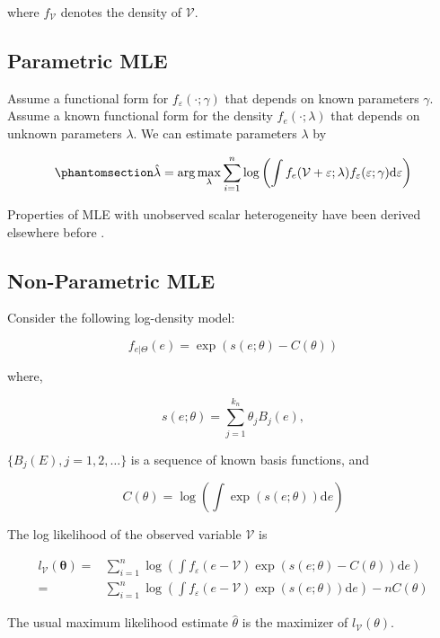 \documentclass[
  12pt]{article}
\theoremstyle{definition}
\theoremstyle{remark}
\begin{document}
where \(f_{\mathcal{V}}\) denotes the density of \(\mathcal{V}\).

\subsection{Parametric MLE}\label{parametric-mle}

Assume a functional form for \(f_{\varepsilon}(\cdot;\gamma)\) that
depends on known parameters \(\gamma\). Assume a known functional form
for the density \(f_e(\cdot;\lambda)\) that depends on unknown
parameters \(\lambda\). We can estimate parameters \(\lambda\) by

\begin{equation}\phantomsection\label{eq-mle}{
\hat \lambda = \arg \max_{\lambda}\sum_{i=1}^n \log \left(\int f_e(\mathcal{V}+\varepsilon;\lambda)f_{\varepsilon}(\varepsilon;\gamma)\text{d}\varepsilon\right)
}\end{equation}

Properties of MLE with unobserved scalar heterogeneity have been derived
elsewhere before \citep{Chen2007, Yi2021}.

\subsection{Non-Parametric MLE}\label{non-parametric-mle}

Consider the following log-density model:

\[
f_{e|\Theta}(e)=\exp(s(e;\theta)-C(\theta))
\]

where,

\[
s(e;\theta)=\sum_{j=1}^{k_n}\theta_j B_j(e),
\]

\(\{B_j(E), j=1,2,\dots\}\) is a sequence of known basis functions, and

\[
C(\theta) = \log\left(\int \exp(s(e;\theta)) \text{d}e \right)
\]

The log likelihood of the observed variable \(\mathcal{V}\) is

\[
\begin{aligned}
    l_{\mathcal{V}}(\mathbf{\theta})=&\sum_{i=1}^{n}\log \left(\int f_{\varepsilon}(e-\mathcal{V})\exp(s(e;\theta)-C(\theta))\text{d}e\right)\\
    =&\sum_{i=1}^{n}\log \left(\int f_{\varepsilon}(e-\mathcal{V})\exp(s(e;\theta))\text{d}e\right)-nC(\theta)
\end{aligned}
\]

The usual maximum likelihood estimate \(\hat{\theta}\) is the maximizer
of \(l_{\mathcal{V}}(\theta)\).
\end{document}
